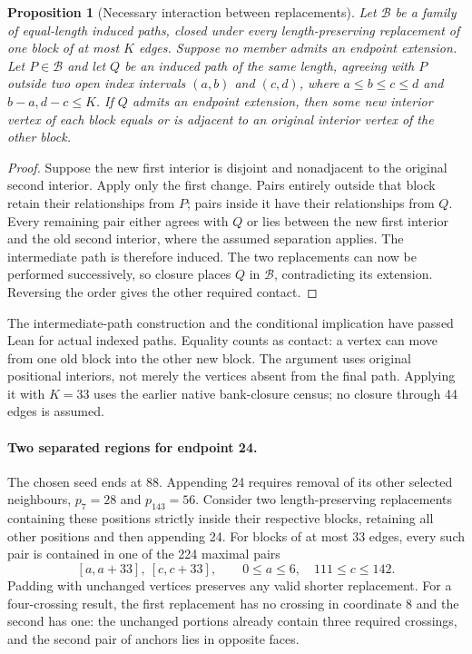 \documentclass[11pt,a4paper]{article}
\newtheorem{proposition}[theorem]{Proposition}
\theoremstyle{definition}
\theoremstyle{remark}
\begin{document}
\begin{proposition}[Necessary interaction between replacements]
\label{prop:interaction224}
Let $\mathcal B$ be a family of equal-length induced paths, closed under
every length-preserving replacement of one block of at most $K$ edges.
Suppose no member admits an endpoint extension. Let $P\in\mathcal B$
and let $Q$ be an induced path of the same length, agreeing with $P$
outside two open index intervals $(a,b)$ and $(c,d)$, where
$a\le b\le c\le d$ and $b-a,d-c\le K$.
If $Q$ admits an endpoint extension, then some new interior vertex of
each block equals or is adjacent to an original interior vertex of
the other block.
\end{proposition}
\begin{proof}
Suppose the new first interior is disjoint and nonadjacent to the
original second interior. Apply only the first change. Pairs entirely
outside that block retain their relationships from $P$; pairs inside
it have their relationships from $Q$. Every remaining pair either
agrees with $Q$ or lies between the new first interior and the old
second interior, where the assumed separation applies. The intermediate
path is therefore induced. The two replacements can now be performed
successively, so closure places $Q$ in $\mathcal B$, contradicting its
extension. Reversing the order gives the other required contact.
\end{proof}
The intermediate-path construction and the conditional implication
have passed Lean for actual indexed paths. Equality counts as contact:
a vertex can move from one old block into the other new block. The
argument uses original positional interiors, not merely the vertices
absent from the final path. Applying it with $K=33$ uses the earlier
native bank-closure census; no closure through 44 edges is assumed.

\paragraph{Two separated regions for endpoint 24.}
The chosen seed ends at 88. Appending 24 requires removal of its other
selected neighbours, $p_7=28$ and $p_{143}=56$. Consider two
length-preserving replacements containing these positions strictly
inside their respective blocks, retaining all other positions and
then appending 24. For blocks of at most 33 edges, every such pair is
contained in one of the 224 maximal pairs
\[
[a,a+33],\ [c,c+33],\qquad
0\le a\le6,\quad111\le c\le142.
\]
Padding with unchanged vertices preserves any valid shorter replacement.
For a four-crossing result, the first replacement has no crossing in
coordinate 8 and the second has one: the unchanged portions already contain three required crossings,
and the second pair of anchors lies in opposite faces.
\end{document}

